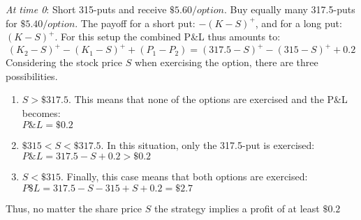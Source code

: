 \documentclass{article}
\begin{document}
\textit{At time 0}: Short 315-puts and receive $\$5.60 / option$. Buy equally many 317.5-puts for $\$5.40/option$.
The payoff for a short put: $-(K-S)^+$, and for a long put: $(K-S)^+$. For this setup the combined P\&L thus amounts to:
$$(K_2-S)^+ -(K_1-S)^+ + (P_1 - P_2) = (317.5-S)^+ - (315-S)^+ + 0.2$$
Considering the stock price $S$ when exercising the option, there are three possibilities.
\begin{enumerate}
	\item $S > \$317.5$. This means that none of the options are exercised and the P\&L becomes: \\ $P\&L = \$0.2$
	\item $\$315 < S < \$317.5$. In this situation, only the 317.5-put is exercised: \\ $P\&L = 317.5 - S + 0.2 > \$0.2$
	\item $S < \$315$. Finally, this case means that both options are exercised: \\$P\$L = 317.5 - S - 315 + S + 0.2 = \$2.7$
\end{enumerate}
Thus, no matter the share price $S$ the strategy implies a profit of at least $\$0.2$
\end{document}
